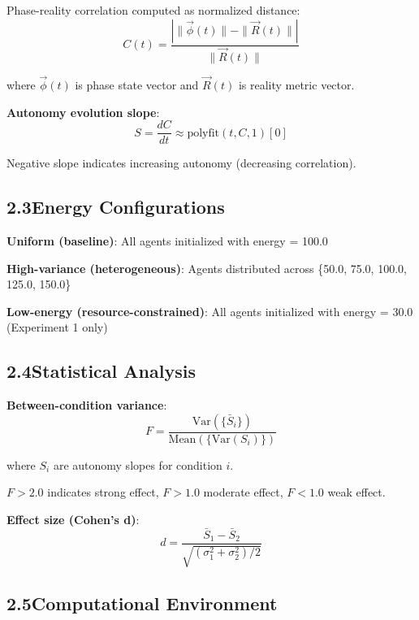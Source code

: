 \documentclass[11pt]{article}
\begin{document}
Phase-reality correlation computed as normalized distance:
\begin{equation}
C(t) = \frac{|\|\vec{\phi}(t)\| - \|\vec{R}(t)\||}{\|\vec{R}(t)\|}
\end{equation}

where $\vec{\phi}(t)$ is phase state vector and $\vec{R}(t)$ is reality metric vector.

\noindent\textbf{Autonomy evolution slope}:
\begin{equation}
S = \frac{dC}{dt} \approx \text{polyfit}(t, C, 1)[0]
\end{equation}

Negative slope indicates increasing autonomy (decreasing correlation).

\subsection*{2.3\quad Energy Configurations}

\noindent\textbf{Uniform (baseline)}: All agents initialized with energy = 100.0

\noindent\textbf{High-variance (heterogeneous)}: Agents distributed across \{50.0, 75.0, 100.0, 125.0, 150.0\}

\noindent\textbf{Low-energy (resource-constrained)}: All agents initialized with energy = 30.0 (Experiment 1 only)

\subsection*{2.4\quad Statistical Analysis}

\noindent\textbf{Between-condition variance}:
\begin{equation}
F = \frac{\text{Var}(\{\bar{S}_i\})}{\text{Mean}(\{\text{Var}(S_i)\})}
\end{equation}

where $S_i$ are autonomy slopes for condition $i$.

$F > 2.0$ indicates strong effect, $F > 1.0$ moderate effect, $F < 1.0$ weak effect.

\noindent\textbf{Effect size (Cohen's d)}:
\begin{equation}
d = \frac{\bar{S}_1 - \bar{S}_2}{\sqrt{(\sigma_1^2 + \sigma_2^2)/2}}
\end{equation}

\subsection*{2.5\quad Computational Environment}
\end{document}
